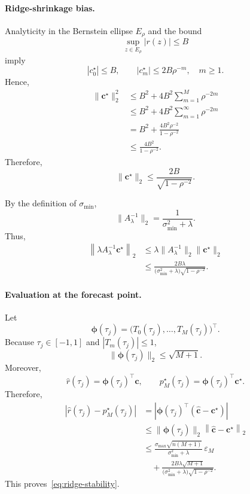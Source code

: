 \paragraph{Ridge-shrinkage bias.}
Analyticity in the Bernstein ellipse $E_\rho$ and the bound
\[
\sup_{z\in E_\rho}|r(z)|\leq B
\]
imply
\[
|c_0^\star|\leq B,
\qquad
|c_m^\star|\leq2B\rho^{-m},
\quad m\geq1.
\]
Hence,
\begin{align}
\|\mathbf{c}^\star\|_2^2
&\leq
B^2+
4B^2\sum_{m=1}^{M}\rho^{-2m}
\nonumber\\
&\leq
B^2+
4B^2\sum_{m=1}^{\infty}\rho^{-2m}
\nonumber\\
&=
B^2+
\frac{4B^2\rho^{-2}}{1-\rho^{-2}}
\nonumber\\
&\leq
\frac{4B^2}{1-\rho^{-2}}.
\end{align}
Therefore,
\begin{equation}
\|\mathbf{c}^\star\|_2
\leq
\frac{2B}{\sqrt{1-\rho^{-2}}}.
\label{eq:app-coefficient-bound}
\end{equation}

By the definition of $\sigma_{\min}$,
\[
\|A_\lambda^{-1}\|_2
=
\frac{1}{\sigma_{\min}^2+\lambda}.
\]
Thus,
\begin{align}
\left\|
\lambda A_\lambda^{-1}\mathbf{c}^\star
\right\|_2
&\leq
\lambda
\|A_\lambda^{-1}\|_2
\|\mathbf{c}^\star\|_2
\nonumber\\
&\leq
\frac{
2B\lambda
}{
\bigl(\sigma_{\min}^2+\lambda\bigr)
\sqrt{1-\rho^{-2}}
}.
\label{eq:app-bias-term}
\end{align}

\paragraph{Evaluation at the forecast point.}
Let
\[
\boldsymbol{\phi}(\tau_j)
=
\bigl(
T_0(\tau_j),\ldots,T_M(\tau_j)
\bigr)^\top.
\]
Because $\tau_j\in[-1,1]$ and $|T_m(\tau_j)|\leq1$,
\[
\|\boldsymbol{\phi}(\tau_j)\|_2
\leq
\sqrt{M+1}.
\]
Moreover,
\[
\widehat r(\tau_j)
=
\boldsymbol{\phi}(\tau_j)^\top\widehat{\mathbf{c}},
\qquad
p_M^\star(\tau_j)
=
\boldsymbol{\phi}(\tau_j)^\top\mathbf{c}^\star.
\]
Therefore,
\begin{align}
\left|
\widehat r(\tau_j)-p_M^\star(\tau_j)
\right|
&=
\left|
\boldsymbol{\phi}(\tau_j)^\top
\left(
\widehat{\mathbf{c}}-\mathbf{c}^\star
\right)
\right|
\nonumber\\
&\leq
\|\boldsymbol{\phi}(\tau_j)\|_2
\left\|
\widehat{\mathbf{c}}-\mathbf{c}^\star
\right\|_2
\nonumber\\
&\leq
\frac{
\sigma_{\max}\sqrt{n(M+1)}
}{
\sigma_{\min}^2+\lambda
}
\,\varepsilon_M
\nonumber\\
&\quad+
\frac{
2B\lambda\sqrt{M+1}
}{
\bigl(\sigma_{\min}^2+\lambda\bigr)
\sqrt{1-\rho^{-2}}
}.
\end{align}
This proves~\eqref{eq:ridge-stability}.

